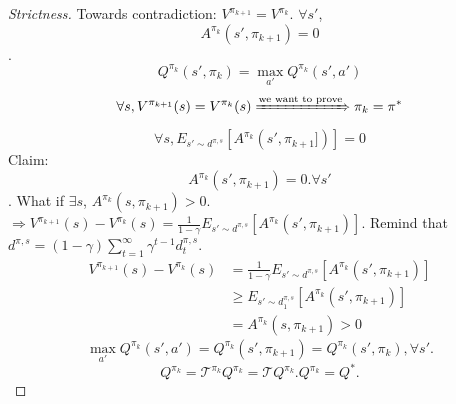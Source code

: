 \documentclass{report}
\begin{document}
\begin{proof}[Strictness] Towards contradiction: $V^{\pi_{k+1}}=V^{\pi_{k}}$. $\forall s'$, \[
        A^{\pi_k}(s',\pi_{k+1})= 0 
    \]. \[
        Q^{\pi_k}(s',\pi_k)=\max_{a'}Q^{\pi_k}(s',a')
    \]
    \[ \forall s, V^{\pi_{k+1}}(s)=V^{\pi_{k}}(s) \xRightarrow{\text{we want to prove}} \pi_k=\pi^*\]
    \[
    \forall s, E_{s'\sim d^{\pi,s}}[A^{\pi_k}(s',\pi_{k+1}])]=0
    \]
    Claim: \[
    A^{\pi_k}(s',\pi_{k+1})=0. \forall s'
    \].
    What if $\exists s$, $A^{\pi_k}(s,\pi_{k+1})>0$. $\Rightarrow V^{\pi_{k+1}}(s)-V^{\pi_{k}}(s)=\frac{1}{1-\gamma}E_{s'\sim d^{\pi,s}}[A^{\pi_k}(s',\pi_{k+1})]$. Remind that $d^{\pi,s}=(1-\gamma)\sum_{t=1}^{\infty}\gamma^{t-1}d^{\pi,s}_t$.
    \begin{equation*}
        \begin{split}
            V^{\pi_{k+1}}(s)-V^{\pi_{k}}(s)&=\frac{1}{1-\gamma}E_{s'\sim d^{\pi,s}}[A^{\pi_k}(s',\pi_{k+1})]\\
            &\geq E_{s'\sim d_1^{\pi,s}}[A^{\pi_k}(s',\pi_{k+1})]\\
            &= A^{\pi_k}(s,\pi_{k+1}) > 0
        \end{split}
    \end{equation*}
    \[
    \max_{a'}Q^{\pi_k}(s',a')=Q^{\pi_k}(s',\pi_{k+1})=Q^{\pi_k}(s',\pi_{k}), \forall s'.
    \]
    \[
        Q^{\pi_k}=\mathcal{T}^{\pi_k}Q^{\pi_k}=\mathcal{T}Q^{\pi_k}. Q^{\pi_k}= Q^*.
    \]
\end{proof}
\printbibliography
\end{document}
